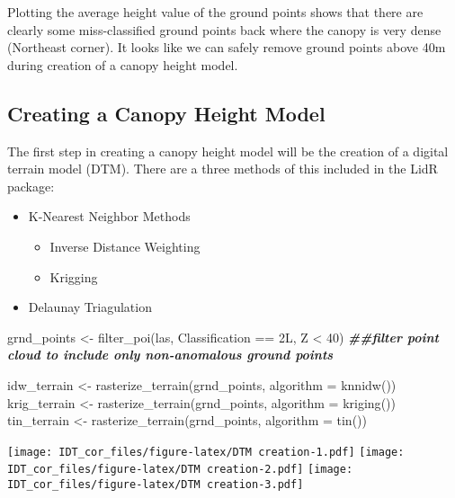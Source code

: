 \documentclass[
]{article}
\newenvironment{Shaded}{\begin{snugshade}}{\end{snugshade}}
\newcommand{\AttributeTok}[1]{\textcolor[rgb]{0.77,0.63,0.00}{#1}}
\newcommand{\DecValTok}[1]{\textcolor[rgb]{0.00,0.00,0.81}{#1}}
\newcommand{\DocumentationTok}[1]{\textcolor[rgb]{0.56,0.35,0.01}{\textbf{\textit{#1}}}}
\newcommand{\FunctionTok}[1]{\textcolor[rgb]{0.00,0.00,0.00}{#1}}
\newcommand{\NormalTok}[1]{#1}
\newcommand{\OtherTok}[1]{\textcolor[rgb]{0.56,0.35,0.01}{#1}}
\newcommand{\SpecialCharTok}[1]{\textcolor[rgb]{0.00,0.00,0.00}{#1}}
\begin{document}
Plotting the average height value of the ground points shows that there
are clearly some miss-classified ground points back where the canopy is
very dense (Northeast corner). It looks like we can safely remove ground
points above 40m during creation of a canopy height model.

\hypertarget{creating-a-canopy-height-model}{%
\subsection{Creating a Canopy Height
Model}\label{creating-a-canopy-height-model}}

The first step in creating a canopy height model will be the creation of
a digital terrain model (DTM). There are a three methods of this
included in the LidR package:

\begin{itemize}
\item
  K-Nearest Neighbor Methods

  \begin{itemize}
  \item
    Inverse Distance Weighting
  \item
    Krigging
  \end{itemize}
\item
  Delaunay Triagulation
\end{itemize}

\begin{Shaded}
\begin{Highlighting}[]
\NormalTok{grnd\_points }\OtherTok{\textless{}{-}} \FunctionTok{filter\_poi}\NormalTok{(las, Classification }\SpecialCharTok{==}\NormalTok{ 2L, Z }\SpecialCharTok{\textless{}} \DecValTok{40}\NormalTok{) }\DocumentationTok{\#\#filter point cloud to include only non{-}anomalous ground points}

\NormalTok{idw\_terrain }\OtherTok{\textless{}{-}} \FunctionTok{rasterize\_terrain}\NormalTok{(grnd\_points, }\AttributeTok{algorithm =} \FunctionTok{knnidw}\NormalTok{())}
\NormalTok{krig\_terrain }\OtherTok{\textless{}{-}} \FunctionTok{rasterize\_terrain}\NormalTok{(grnd\_points, }\AttributeTok{algorithm =} \FunctionTok{kriging}\NormalTok{())}
\NormalTok{tin\_terrain }\OtherTok{\textless{}{-}} \FunctionTok{rasterize\_terrain}\NormalTok{(grnd\_points, }\AttributeTok{algorithm =} \FunctionTok{tin}\NormalTok{())}
\end{Highlighting}
\end{Shaded}

\texttt{[image: IDT\_cor\_files/figure-latex/DTM creation-1.pdf]}
\texttt{[image: IDT\_cor\_files/figure-latex/DTM creation-2.pdf]}
\texttt{[image: IDT\_cor\_files/figure-latex/DTM creation-3.pdf]}
\end{document}
